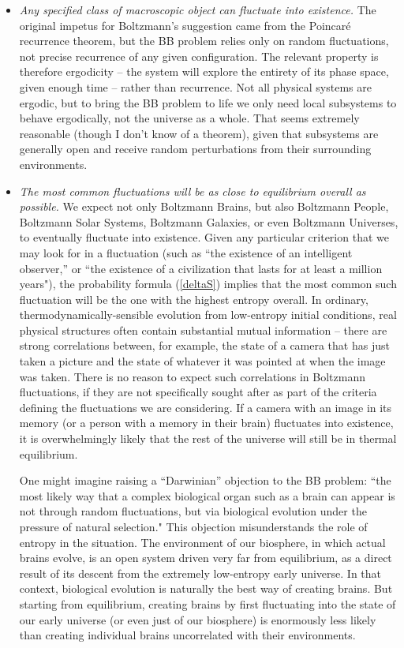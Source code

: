 \documentclass[12pt,letterpaper]{article}
\begin{document}
\begin{itemize}
\item{}\emph{Any specified class of macroscopic object can fluctuate into existence.}
The original impetus for Boltzmann's suggestion came from the Poincar\'e recurrence theorem, but the BB problem relies only on random fluctuations, not precise recurrence of any given configuration.
The relevant property is therefore ergodicity -- the system will explore the entirety of its phase space, given enough time -- rather than recurrence.
Not all physical systems are ergodic, but to bring the BB problem to life we only need local subsystems to behave ergodically, not the universe as a whole. 
That seems extremely reasonable (though I don't know of a theorem), given that subsystems are generally open and receive random perturbations from their surrounding environments.

\item{}\emph{The most common fluctuations will be as close to equilibrium overall as possible.}
We expect not only Boltzmann Brains, but also Boltzmann People, Boltzmann Solar Systems, Boltzmann Galaxies, or even Boltzmann Universes, to eventually fluctuate into existence.
Given any particular criterion that we may look for in a fluctuation (such as ``the existence of an intelligent observer,'' or ``the existence of a civilization that lasts for at least a million years"), the probability formula (\ref{deltaS}) implies that the most common such fluctuation will be the one with the highest entropy overall.
In ordinary, thermodynamically-sensible evolution from low-entropy initial conditions, real physical structures often 
contain substantial mutual information -- there are strong correlations between, for example, the state of a camera that has just taken a picture and the state of whatever it was pointed at when the image was taken.
There is no reason to expect such correlations in Boltzmann fluctuations, if they are not specifically sought after as part of the criteria defining the fluctuations we are considering.
If a camera with an image in its memory (or a person with a memory in their brain) fluctuates into existence, it is overwhelmingly likely that the rest of the universe will still be in thermal equilibrium.

One might imagine raising a ``Darwinian'' objection to the BB problem: ``the most likely way that a complex biological organ such as a brain can appear is not through random fluctuations, but via biological evolution under the pressure of natural selection."
This objection misunderstands the role of entropy in the situation.
The environment of our biosphere, in which actual brains evolve, is an open system driven very far from equilibrium, as a direct result of its descent from the extremely low-entropy early universe.
In that context, biological evolution is naturally the best way of creating brains.
But starting from equilibrium, creating brains by first fluctuating into the state of our early universe (or even just of our biosphere) is enormously less likely than creating individual brains uncorrelated with their environments.


\end{itemize}
\end{document}
